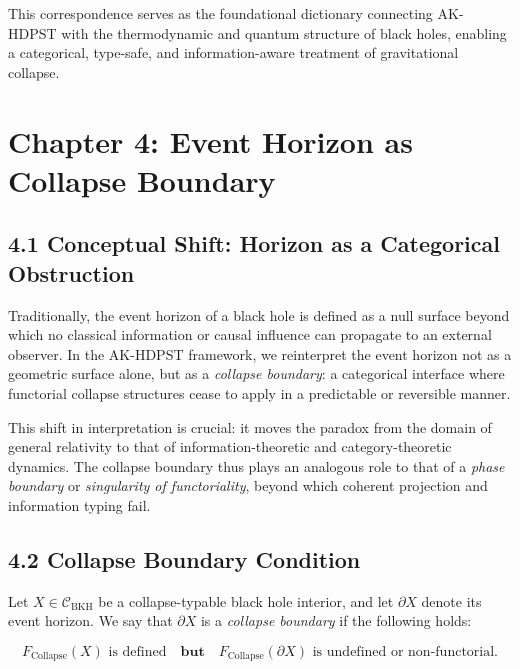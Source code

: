\documentclass[11pt]{article}
\begin{document}
This correspondence serves as the foundational dictionary connecting AK-HDPST with the thermodynamic and quantum structure of black holes, enabling a categorical, type-safe, and information-aware treatment of gravitational collapse.



\section{Chapter 4: Event Horizon as Collapse Boundary}

\subsection*{4.1 Conceptual Shift: Horizon as a Categorical Obstruction}

Traditionally, the event horizon of a black hole is defined as a null surface beyond which no classical information or causal influence can propagate to an external observer. In the AK-HDPST framework, we reinterpret the event horizon not as a geometric surface alone, but as a \emph{collapse boundary}: a categorical interface where functorial collapse structures cease to apply in a predictable or reversible manner.

This shift in interpretation is crucial: it moves the paradox from the domain of general relativity to that of information-theoretic and category-theoretic dynamics. The collapse boundary thus plays an analogous role to that of a \emph{phase boundary} or \emph{singularity of functoriality}, beyond which coherent projection and information typing fail.

\subsection*{4.2 Collapse Boundary Condition}

Let \( X \in \mathcal{C}_{\mathrm{BKH}} \) be a collapse-typable black hole interior, and let \( \partial X \) denote its event horizon. We say that \( \partial X \) is a \textit{collapse boundary} if the following holds:

\[
F_{\mathrm{Collapse}}(X) \text{ is defined} \quad \textbf{but} \quad F_{\mathrm{Collapse}}(\partial X) \text{ is undefined or non-functorial}.
\]
\end{document}
